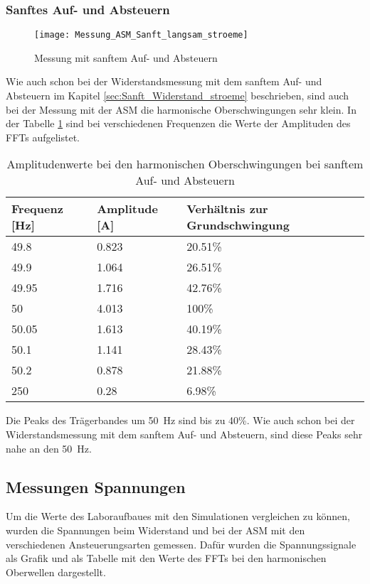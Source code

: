 \newpage
\subsubsection*{Sanftes Auf- und Absteuern}
\begin{figure}[ht!]
	\centering
	\texttt{[image: Messung\_ASM\_Sanft\_langsam\_stroeme]}	
	\caption{Messung mit sanftem Auf- und Absteuern}\label{fig:Mess_Sanft_langsam_stroeme}
\end{figure}

Wie auch schon bei der Widerstandsmessung mit dem sanftem Auf- und Absteuern im Kapitel \ref{sec:Sanft_Widerstand_stroeme} beschrieben, sind auch bei der Messung mit der ASM die harmonische Oberschwingungen sehr klein. In der Tabelle \ref{tab:Sanft_langsam_ASM_stroeme} sind bei verschiedenen Frequenzen die Werte der Amplituden des FFTs aufgelistet. 

\begin{table}[ht!]
	\centering
	\begin{tabular}{|l|l|l|}
		\hline
		Frequenz {[}Hz{]} & Amplitude {[}A{]} & Verhältnis zur Grundschwingung	\\ \hline
		49.8              & 0.823             & 20.51\%							\\ \hline
		49.9              & 1.064             & 26.51\%							\\ \hline
		49.95             & 1.716             & 42.76\%							\\ \hline
		50                & 4.013             & 100\%							\\ \hline
		50.05             & 1.613             & 40.19\%							\\ \hline
		50.1              & 1.141             & 28.43\%							\\ \hline
		50.2              & 0.878             & 21.88\%							\\ \hline
		250               & 0.28              & 6.98\%							\\ \hline
	\end{tabular}
	\caption{Amplitudenwerte bei den harmonischen Oberschwingungen bei sanftem Auf- und Absteuern}\label{tab:Sanft_langsam_ASM_stroeme}
\end{table}

Die Peaks des Trägerbandes um \SI{50}{Hz} sind bis zu 40\%. Wie auch schon bei der Widerstandsmessung mit dem sanftem Auf- und Absteuern, sind diese Peaks sehr nahe an den \SI{50}{Hz}.


\newpage
\subsection{Messungen Spannungen}
Um die Werte des Laboraufbaues mit den Simulationen vergleichen zu können, wurden die Spannungen beim Widerstand und bei der ASM mit den verschiedenen Ansteuerungsarten gemessen. Dafür wurden die Spannungssignale als Grafik und als Tabelle mit den Werte des FFTs bei den harmonischen Oberwellen dargestellt. 

